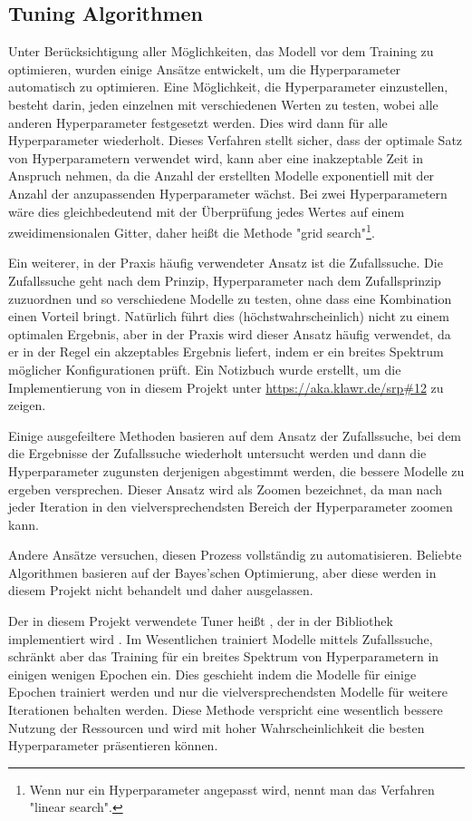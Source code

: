 \subsection{Tuning Algorithmen}

Unter Berücksichtigung aller Möglichkeiten, das Modell vor dem Training zu optimieren, wurden einige Ansätze entwickelt, um die Hyperparameter automatisch zu optimieren.
Eine Möglichkeit, die Hyperparameter einzustellen, besteht darin, jeden einzelnen mit verschiedenen Werten zu testen, wobei alle anderen Hyperparameter festgesetzt werden.
Dies wird dann für alle Hyperparameter wiederholt.
Dieses Verfahren stellt sicher, dass der optimale Satz von Hyperparametern verwendet wird, kann aber eine inakzeptable Zeit in Anspruch nehmen, da die Anzahl der erstellten Modelle exponentiell mit der Anzahl der anzupassenden Hyperparameter wächst.
Bei zwei Hyperparametern wäre dies gleichbedeutend mit der Überprüfung jedes Wertes auf einem zweidimensionalen Gitter, daher heißt die Methode "grid search"\footnote{Wenn nur ein Hyperparameter angepasst wird, nennt man das Verfahren "linear search".}.

Ein weiterer, in der Praxis häufig verwendeter Ansatz ist die Zufallssuche.
Die Zufallssuche geht nach dem Prinzip, Hyperparameter nach dem Zufallsprinzip zuzuordnen und so verschiedene Modelle zu testen, ohne dass eine Kombination einen Vorteil bringt.
Natürlich führt dies (höchstwahrscheinlich) nicht zu einem optimalen Ergebnis, aber in der Praxis wird dieser Ansatz häufig verwendet, da er in der Regel ein akzeptables Ergebnis liefert, indem er ein breites Spektrum möglicher Konfigurationen prüft.
Ein Notizbuch wurde erstellt, um die Implementierung von  in diesem Projekt unter \url{https://aka.klawr.de/srp\#12} zu zeigen.

Einige ausgefeiltere Methoden basieren auf dem Ansatz der Zufallssuche, bei dem die Ergebnisse der Zufallssuche wiederholt untersucht werden und dann die Hyperparameter zugunsten derjenigen abgestimmt werden, die bessere Modelle zu ergeben versprechen.
Dieser Ansatz wird als Zoomen bezeichnet, da man nach jeder Iteration in den vielversprechendsten Bereich der Hyperparameter zoomen kann.

Andere Ansätze versuchen, diesen Prozess vollständig zu automatisieren.
Beliebte Algorithmen basieren auf der Bayes'schen Optimierung, aber diese werden in diesem Projekt nicht behandelt und daher ausgelassen.

Der in diesem Projekt verwendete Tuner heißt  \cite{Li2018}, der in der Bibliothek  implementiert wird \cite{Google2019a}.
Im Wesentlichen trainiert  Modelle mittels Zufallssuche, schränkt aber das Training für ein breites Spektrum von Hyperparametern in einigen wenigen Epochen ein.
Dies geschieht indem die Modelle für einige Epochen trainiert werden und nur die vielversprechendsten Modelle für weitere Iterationen behalten werden.
Diese Methode verspricht eine wesentlich bessere Nutzung der Ressourcen und wird mit hoher Wahrscheinlichkeit die besten Hyperparameter präsentieren können.

